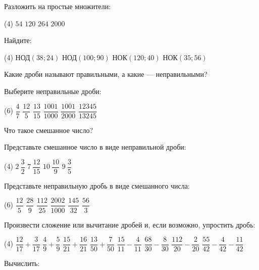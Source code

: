 \begin{class}[number=4]
	\begin{listofex}
	\item Разложить на простые множители:
	\begin{tasks}(4)
		\task \( 54 \)
		\task \( 120 \)
		\task \( 264 \)
		\task \( 2000 \)
	\end{tasks}
	\item Найдите:
	\begin{tasks}(4)
		\task НОД\( (38; 24) \)
		\task НОД\( (100; 90) \)
		\task НОК\( (120; 40) \)
		\task НОК\( (35; 56) \)
	\end{tasks}
	\item Какие дроби называют правильными, а какие --- неправильными?
	\item Выберите неправильные дроби:
	\begin{tasks}(6)
		\task \( \dfrac{4}{7} \)
		\task \( \dfrac{12}{5} \)
		\task \( \dfrac{13}{15} \)
		\task \( \dfrac{1001}{1000} \)
		\task \( \dfrac{1001}{2000} \)
		\task \( \dfrac{12345}{13245} \)
	\end{tasks}
	\item Что такое смешанное число?
	\item Представьте смешанное число в виде неправильной дроби:
	\begin{tasks}(4)
		\task \( 2\:\dfrac{3}{2} \)
		\task \( 7\:\dfrac{12}{15} \)
		\task \( 10\:\dfrac{10}{9} \)
		\task \( 9\:\dfrac{3}{5} \)
	\end{tasks}
	\item Представьте неправильную дробь в виде смешанного числа:
	\begin{tasks}(6)
		\task \( \dfrac{12}{5} \)
		\task \( \dfrac{28}{9} \)
		\task \( \dfrac{112}{25} \)
		\task \( \dfrac{2002}{1000} \)
		\task \( \dfrac{145}{32} \)
		\task \( \dfrac{56}{3} \)
	\end{tasks}
	\item Произвести сложение или вычитание дробей и, если возможно, упростить дробь:
	\begin{tasks}(4)
		\task \( \dfrac{12}{17}+\dfrac{3}{17} \)
		\task \( \dfrac{4}{9}+\dfrac{5}{9} \)
		\task \( \dfrac{15}{21}+\dfrac{16}{21} \)
		\task \( \dfrac{13}{50}+\dfrac{7}{50} \)
		\task \( \dfrac{15}{11}-\dfrac{4}{11} \)
		\task \( \dfrac{68}{30}-\dfrac{8}{30} \)
		\task \( \dfrac{112}{20}-\dfrac{2}{20} \)
		\task \( \dfrac{55}{42}-\dfrac{4}{42}-\dfrac{11}{42} \)
	\end{tasks}
	\item Вычислить:

\end{listofex}
\end{class}
